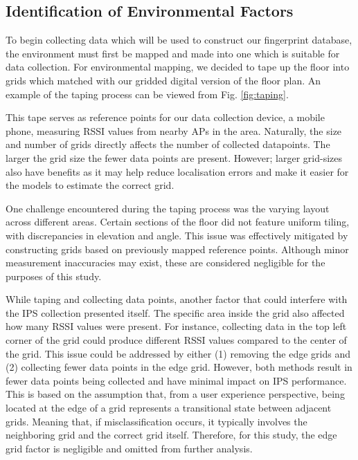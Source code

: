 \documentclass[runningheads]{llncs}
\begin{document}
\subsection{Identification of Environmental Factors}
To begin collecting data which will be used to construct our fingerprint database, the environment must first be mapped and made into one which is suitable for data collection. For environmental mapping, we decided to tape up the floor into grids which matched with our gridded digital version of the floor plan. An example of the taping process can be viewed from Fig. \ref{fig:taping}. 

This tape serves as reference points for our data collection device, a mobile phone, measuring RSSI values from nearby APs in the area. Naturally, the size and number of grids directly affects the number of collected datapoints. The larger the grid size the fewer data points are present. However; larger grid-sizes also have benefits as it may help reduce localisation errors and make it easier for the models to estimate the correct grid.


One challenge encountered during the taping process was the varying layout across different areas. Certain sections of the floor did not feature uniform tiling, with discrepancies in elevation and angle. This issue was effectively mitigated by constructing grids based on previously mapped reference points. Although minor measurement inaccuracies may exist, these are considered negligible for the purposes of this study.

While taping and collecting data points, another factor that could interfere with the IPS collection presented itself. The specific area inside the grid also affected how many RSSI values were present. For instance, collecting data in the top left corner of the grid could produce different RSSI values compared to the center of the grid. This issue could be addressed by either (1) removing the edge grids and (2) collecting fewer data points in the edge grid. However, both methods result in fewer data points being collected and have minimal impact on IPS performance. This is based on the assumption that, from a user experience perspective, being located at the edge of a grid represents a transitional state between adjacent grids. Meaning that, if misclassification occurs, it typically involves the neighboring grid and the correct grid itself. Therefore, for this study, the edge grid factor is negligible and omitted from further analysis.
\end{document}
